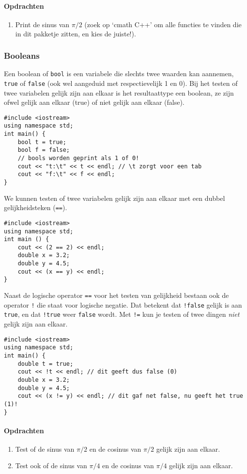 \documentclass[12pt,a4paper]{article}
\newcommand{\icode}{\lstinline}
\begin{document}
\paragraph{Opdrachten}
\begin{enumerate} 
\item 
Print de sinus van $\pi/2$ (zoek op `cmath C++’ om alle functies te vinden die in dit 
pakketje zitten, en kies de juiste!). 
\end{enumerate} 
\subsubsection{Booleans}
Een boolean of \icode{bool} is een variabele die slechts twee waarden kan aannemen, \icode{true} of 
\icode{false} (ook wel aangeduid met respectievelijk 1 en 0). Bij het testen of twee variabelen gelijk 
zijn aan elkaar is het resultaattype een boolean, ze zijn ofwel gelijk aan elkaar (true) of niet gelijk aan 
elkaar (false).
\begin{lstlisting}
#include <iostream> 
using namespace std; 
int main() {
	bool t = true;
	bool f = false; 
	// bools worden geprint als 1 of 0! 
	cout << "t:\t" << t << endl; // \t zorgt voor een tab
	cout << "f:\t" << f << endl; 
}
\end{lstlisting}

We kunnen testen of twee variabelen gelijk zijn aan elkaar met een dubbel gelijkheidsteken (\icode{==}). 
\begin{lstlisting}
#include <iostream> 
using namespace std;
int main () {
	cout << (2 == 2) << endl; 
	double x = 3.2; 
	double y = 4.5; 
	cout << (x == y) << endl; 
}
\end{lstlisting}
Naast de logische operator \icode{==} voor het testen van gelijkheid bestaan ook de operator \icode{!} die staat voor 
logische negatie. Dat betekent dat \icode{!false} gelijk is aan \icode{true}, en dat \icode{!true} weer \icode{false} wordt.
Met \icode{!=} kun je testen of twee dingen \emph{niet} gelijk zijn aan elkaar. 
\begin{lstlisting}
#include <iostream> 
using namespace std; 
int main() {
	double t = true; 
	cout << !t << endl; // dit geeft dus false (0) 
	double x = 3.2; 
	double y = 4.5; 
	cout << (x != y) << endl; // dit gaf net false, nu geeft het true (1)! 
}
\end{lstlisting}
\paragraph{Opdrachten} 
\begin{enumerate}
\item 
Test of de sinus van $\pi/2$ en de cosinus van $\pi/2$ gelijk zijn aan elkaar.
\item
Test ook of de sinus van $\pi/4$ en de cosinus van $\pi/4$ gelijk zijn aan elkaar.
\end{enumerate} 
\end{document}
